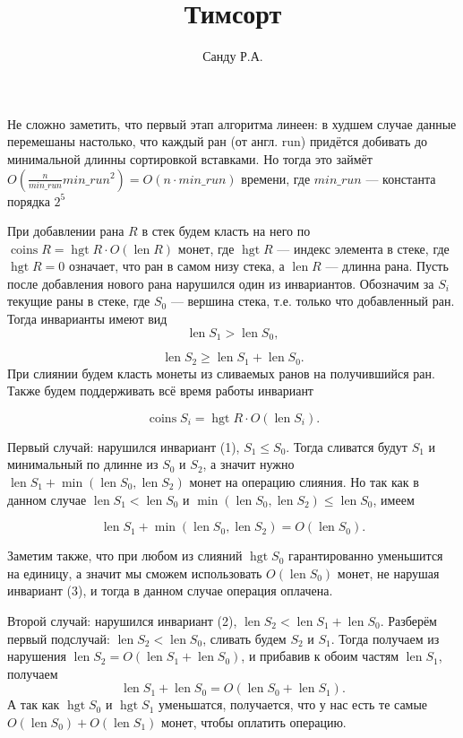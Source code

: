 \documentclass[11pt]{article}
\title{Тимсорт}
\author{Санду Р.А.}
\newcommand{\len}[0]{\operatorname{len}}
\newcommand{\hgt}[0]{\operatorname{hgt}}
\newcommand{\coins}[0]{\operatorname{coins}}
\begin{document}
\maketitle

Не сложно заметить, что первый этап алгоритма линеен: в худшем случае данные перемешаны настолько, что каждый ран (от англ. run) придётся добивать до минимальной длинны сортировкой вставками. Но тогда это займёт $O(\frac{n}{min\_run}min\_run^2) = O(n\cdot min\_run)$ времени, где $min\_run$ — константа порядка $2^5$

При добавлении рана $R$ в стек будем класть на него по $\coins R = \hgt R\cdot O(\len R)$ монет, где $\hgt R$ — индекс элемента в стеке, где $\hgt R = 0$ означает, что ран в самом низу стека, а $\len R$ — длинна рана. Пусть после добавления нового рана нарушился один из инвариантов. Обозначим за $S_i$ текущие раны в стеке, где $S_0$ — вершина стека, т.е. только что добавленный ран. Тогда инварианты имеют вид
\begin{equation}
	\len S_1 > \len S_0,
\end{equation}

\begin{equation}
	\len S_2 \geq \len S_1 + \len S_0.
\end{equation}
При слиянии будем класть монеты из сливаемых ранов на получившийся ран.
Также будем поддерживать всё время работы инвариант

\begin{equation}
	\coins S_i = \hgt R \cdot O(\len S_i).
\end{equation}

Первый случай: нарушился инвариант (1), $S_1 \leq S_0$.
Тогда сливатся будут $S_1$ и минимальный по длинне из $S_0$ и $S_2$, а значит нужно $\len S_1 + \min(\len S_0,\len S_2)$ монет на операцию слияния. Но так как в данном случае $\len S_1 < \len S_0$ и $\min(\len S_0, \len S_2) \leq \len S_0$, имеем 

\begin{equation}
	\len S_1 + \min(\len S_0,\len S_2) = O(\len S_0).
\end{equation}

Заметим также, что при любом из слияний $\hgt S_0$ гарантированно уменьшится на единицу, а значит мы сможем использовать $O(\len S_0)$ монет, не нарушая инвариант (3), и тогда в данном случае операция оплачена.


Второй случай: нарушился инвариант (2), $\len S_2 < \len S_1 + \len S_0$. 
Разберём первый подслучай: $\len S_2 < \len S_0$, сливать будем $S_2$ и $S_1$. Тогда получаем из нарушения $\len S_2 = O(\len S_1 + \len S_0)$, и прибавив к обоим частям $\len S_1$, получаем 
\begin{equation}
	\len S_1 + \len S_0 = O(\len S_0 + \len S_1).
\end{equation}
 А так как $\hgt S_0$ и $\hgt S_1$ уменьшатся, получается, что у нас есть те самые $O(\len S_0) + O(\len S_1)$ монет, чтобы оплатить операцию.
\end{document}
